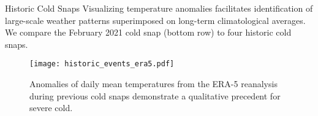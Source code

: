\begin{block}{Historic Cold Snaps}
    Visualizing temperature anomalies facilitates identification of large-scale weather patterns superimposed on long-term climatological averages.
    We compare the February 2021 cold snap (bottom row) to four historic cold snaps.
    \begin{framed}
        \begin{figure}
            \centering
            \texttt{[image: historic\_events\_era5.pdf]}
            \caption{
                Anomalies of daily mean temperatures from the ERA-5 reanalysis \cite{hersbach_era5:2020} during previous cold snaps demonstrate a qualitative precedent for severe cold.
            }\label{fig:historic_era5}
        \end{figure}
    \end{framed}
\end{block}